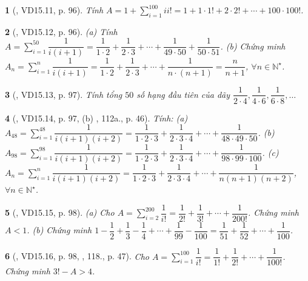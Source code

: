 \documentclass{article}
\newtheorem{baitoan}{}
\begin{document}
\begin{baitoan}[\cite{TLCT_THCS_Toan_6_so_hoc}, VD15.11, p. 96]
	Tính $A = 1 + \sum_{i=1}^{100} ii!  = 1 + 1\cdot1! + 2\cdot2! + \cdots + 100\cdot100!$.
\end{baitoan}

\begin{baitoan}[\cite{TLCT_THCS_Toan_6_so_hoc}, VD15.12, p. 96]
	(a) Tính $A = \sum_{i=1}^{50} \dfrac{1}{i(i + 1)} = \dfrac{1}{1\cdot2} + \dfrac{1}{2\cdot3} + \cdots + \dfrac{1}{49\cdot50} + \dfrac{1}{50\cdot51}$. (b) Chứng minh $A_n = \sum_{i=1}^n \dfrac{1}{i(i + 1)} = \dfrac{1}{1\cdot2} + \dfrac{1}{2\cdot3} + \cdots + \dfrac{1}{n\cdot(n + 1)} = \dfrac{n}{n + 1}$, $\forall n\in\mathbb{N}^\star$.
\end{baitoan}

\begin{baitoan}[\cite{TLCT_THCS_Toan_6_so_hoc}, VD15.13, p. 97]
	Tính tổng $50$ số hạng đầu tiên của dãy $\dfrac{1}{2\cdot4},\dfrac{1}{4\cdot6},\dfrac{1}{6\cdot8},\ldots$
\end{baitoan}

\begin{baitoan}[\cite{TLCT_THCS_Toan_6_so_hoc}, VD15.14, p. 97, (b) \cite{Binh_boi_duong_Toan_6_tap_2}, 112a., p. 46]
	Tính: (a) $A_{48} = \sum_{i=1}^{48} \dfrac{1}{i(i + 1)(i + 2)} = \dfrac{1}{1\cdot2\cdot3} + \dfrac{1}{2\cdot3\cdot4} + \cdots + \dfrac{1}{48\cdot49\cdot50}$. (b) $A_{98} = \sum_{i=1}^{98} \dfrac{1}{i(i + 1)(i + 2)} = \dfrac{1}{1\cdot2\cdot3} + \dfrac{1}{2\cdot3\cdot4} + \cdots + \dfrac{1}{98\cdot99\cdot100}$. (c) $A_n = \sum_{i=1}^n \dfrac{1}{i(i + 1)(i + 2)} = \dfrac{1}{1\cdot2\cdot3} + \dfrac{1}{2\cdot3\cdot4} + \cdots + \dfrac{1}{n(n + 1)(n + 2)}$, $\forall n\in\mathbb{N}^\star$.
\end{baitoan}

\begin{baitoan}[\cite{TLCT_THCS_Toan_6_so_hoc}, VD15.15, p. 98]
	(a) Cho $A = \sum_{i=2}^{200} \dfrac{1}{i!} = \dfrac{1}{2!} + \dfrac{1}{3!} + \cdots + \dfrac{1}{200!}$. Chứng minh $A < 1$. (b) Chứng minh $1 - \dfrac{1}{2} + \dfrac{1}{3} - \dfrac{1}{4} + \cdots + \dfrac{1}{99} - \dfrac{1}{100} = \dfrac{1}{51} + \dfrac{1}{52} + \cdots + \dfrac{1}{100}$.
\end{baitoan}

\begin{baitoan}[\cite{TLCT_THCS_Toan_6_so_hoc}, VD15.16, p. 98, \cite{Binh_Toan_6_tap_2}, 118., p. 47]
	Cho $A = \sum_{i=1}^{100} \dfrac{1}{i!} = \dfrac{1}{1!} + \dfrac{1}{2!} + \cdots + \dfrac{1}{100!}$. Chứng minh $3! - A > 4$.
\end{baitoan}
\end{document}
